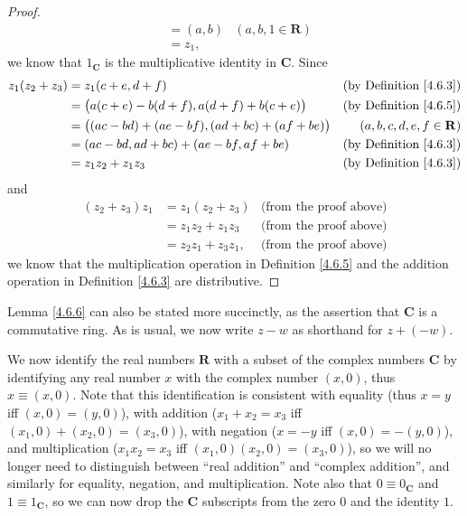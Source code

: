 \begin{proof}
\begin{align*}
                           & = (a, b)                 & (a, b, 1 \in \mathbf{R})           \\
                           & = z_1,
    \end{align*}
    we know that \(1_{\mathbf{C}}\) is the multiplicative identity in \(\mathbf{C}\).
    Since
    \begin{align*}
        z_1 (z_2 + z_3) & = z_1 (c + e, d + f)                                      & \text{(by Definition \ref{4.6.3})} \\
                        & = \big(a (c + e) - b (d + f), a (d + f) + b (c + e)\big)  & \text{(by Definition \ref{4.6.5})} \\
                        & = \big((ac - bd) + (ae - bf), (ad + bc) + (af + be) \big) & (a, b, c, d, e, f \in \mathbf{R})  \\
                        & = (ac - bd, ad + bc) + (ae - bf, af + be)                 & \text{(by Definition \ref{4.6.3})} \\
                        & = z_1 z_2 + z_1 z_3                                       & \text{(by Definition \ref{4.6.3})}
    \end{align*}
    and
    \begin{align*}
        (z_2 + z_3) z_1 & = z_1 (z_2 + z_3)    & \text{(from the proof above)} \\
                        & = z_1 z_2 + z_1 z_3  & \text{(from the proof above)} \\
                        & = z_2 z_1 + z_3 z_1, & \text{(from the proof above)}
    \end{align*}
    we know that the multiplication operation in Definition \ref{4.6.5} and the addition operation in Definition \ref{4.6.3} are distributive.
\end{proof}

\begin{note}
    Lemma \ref{4.6.6} can also be stated more succinctly, as the assertion that \(\mathbf{C}\) is a commutative ring.
    As is usual, we now write \(z - w\) as shorthand for \(z + (-w)\).
\end{note}

\begin{note}
    We now identify the real numbers \(\mathbf{R}\) with a subset of the complex numbers \(\mathbf{C}\) by identifying any real number \(x\) with the complex number \((x, 0)\), thus \(x \equiv (x, 0)\).
    Note that this identification is consistent with equality (thus \(x = y\) iff \((x, 0) = (y, 0)\)), with addition (\(x_1 + x_2 = x_3\) iff \((x_1, 0) + (x_2, 0) = (x_3, 0)\)), with negation (\(x = -y\) iff \((x, 0) = -(y, 0)\)), and multiplication (\(x_1 x_2 = x_3\) iff \((x_1, 0) (x_2, 0) = (x_3, 0)\)), so we will no longer need to distinguish between ``real addition'' and ``complex addition'', and similarly for equality, negation, and multiplication.
    Note also that \(0 \equiv 0_\mathbf{C}\) and \(1 \equiv 1_\mathbf{C}\), so we can now drop the \(\mathbf{C}\) subscripts from the zero \(0\) and the identity \(1\).
\end{note}

